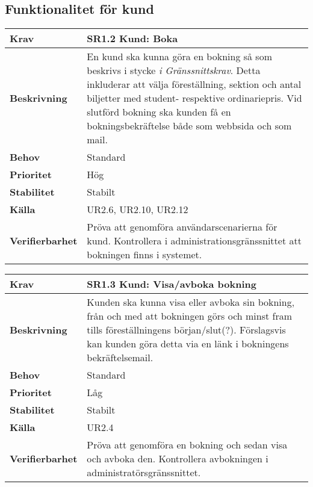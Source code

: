 \documentclass[a4paper, twoside, 11pt, titlepage]{article}
\begin{document}
	\subsection{Funktionalitet för kund}


	\begin{tabular} { p{2.6cm} p{12.5cm} }
		\hline
		\sffamily\textbf{Krav} & \sffamily\textbf{SR1.2 Kund: Boka } \\
		\hline
		\sffamily\textbf{Beskrivning} & En kund ska kunna göra en bokning så som beskrivs i stycke \emph{i Gränssnittskrav}. Detta inkluderar att välja föreställning, sektion och antal biljetter med student- respektive ordinariepris. Vid slutförd bokning ska kunden få en bokningsbekräftelse både som webbsida och som mail.  \\
		\hline
		\sffamily\textbf{Behov} & Standard  \\
		\hline
		\sffamily\textbf{Prioritet} & Hög  \\
		\hline
		\sffamily\textbf{Stabilitet} & Stabilt  \\
		\hline
		\sffamily\textbf{Källa} & UR2.6, UR2.10, UR2.12  \\
		\hline
		\sffamily\textbf{Verifierbarhet} & Pröva att genomföra användarscenarierna för kund. Kontrollera i administrationsgränssnittet att bokningen finns i systemet.  \\
		\hline
	\end{tabular}
	\vspace{6mm}

	\begin{tabular} { p{2.6cm} p{12.5cm} }
		\hline
		\sffamily\textbf{Krav} & \sffamily\textbf{SR1.3 Kund: Visa/avboka bokning } \\
		\hline
		\sffamily\textbf{Beskrivning} & Kunden ska kunna visa eller avboka sin bokning, från och med att bokningen görs och minst fram tills föreställningens början/slut(?). Förslagsvis kan kunden göra detta via en länk i bokningens bekräftelsemail.  \\
		\hline
		\sffamily\textbf{Behov} & Standard  \\
		\hline
		\sffamily\textbf{Prioritet} & Låg  \\
		\hline
		\sffamily\textbf{Stabilitet} & Stabilt  \\
		\hline
		\sffamily\textbf{Källa} & UR2.4  \\
		\hline
		\sffamily\textbf{Verifierbarhet} & Pröva att genomföra en bokning och sedan visa och avboka den. Kontrollera avbokningen i administratörsgränssnittet.  \\
		\hline
	\end{tabular}
	\vspace{6mm}
\end{document}
